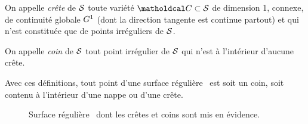 \begin{definition}[Crête]
	On appelle \emph{crête} de $\mathcal{S}$ toute variété $\crete \subset \interface$ de dimension 1, connexe, de continuité globale $G^{1}$ (\ie dont la direction tangente est continue partout) et qui n'est constituée que de points irréguliers de $\mathcal{S}$.
\end{definition}

\begin{definition}[Coin]
	On appelle \emph{coin} de $\mathcal{S}$ tout point irrégulier de $\mathcal{S}$ qui n'est à l'intérieur d'aucune crête.
\end{definition}

Avec ces définitions, tout point d'une surface régulière \piecewise\ est soit un coin, soit contenu à l'intérieur d'une nappe ou d'une crête.


\begin{figure}
	\centering
	
	\caption{Surface régulière \piecewise\ dont les crêtes et coins sont mis en évidence.}
	\label{fig:piecewise_smooth_surface_decomposition}
\end{figure}



